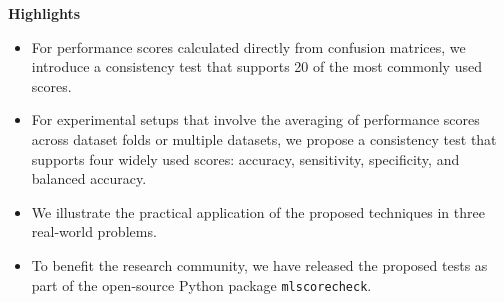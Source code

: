 \documentclass{article}
\begin{document}
\begin{center}
{
\Large\bf
Highlights
}
\end{center}
\bigskip

\bigskip 

\begin{itemize}
\item For performance scores calculated directly from confusion matrices, we introduce a consistency test that supports 20 of the most commonly used scores. 
\item For experimental setups that involve the averaging of performance scores across dataset folds or multiple datasets, we propose a consistency test that supports four widely used scores: accuracy, sensitivity, specificity, and balanced accuracy.
\item We illustrate the practical application of the proposed techniques in three real-world problems. 
\item To benefit the research community, we have released the proposed tests as part of the open-source Python package \verb|mlscorecheck|. 
\end{itemize}
\end{document}
